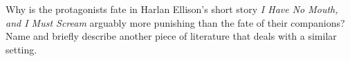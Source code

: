 \needspace{2cm}
\question[5] Why is the protagonists fate in Harlan Ellison's short story \textit{I Have No Mouth, and I Must Scream}
arguably more punishing than the fate of their companions?
Name and briefly describe another piece of literature that deals with a similar setting.
\vspace{6cm}
